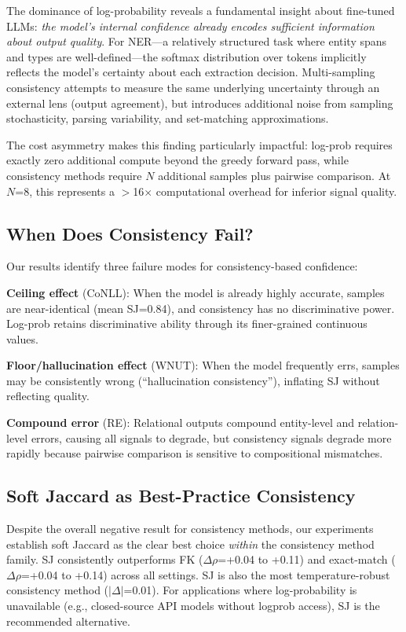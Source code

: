 \documentclass[11pt,a4paper]{article}
\begin{document}
The dominance of log-probability reveals a fundamental insight about fine-tuned LLMs: \emph{the model's internal confidence already encodes sufficient information about output quality}. For NER---a relatively structured task where entity spans and types are well-defined---the softmax distribution over tokens implicitly reflects the model's certainty about each extraction decision. Multi-sampling consistency attempts to measure the same underlying uncertainty through an external lens (output agreement), but introduces additional noise from sampling stochasticity, parsing variability, and set-matching approximations.

The cost asymmetry makes this finding particularly impactful: log-prob requires exactly zero additional compute beyond the greedy forward pass, while consistency methods require $N$ additional samples plus pairwise comparison. At $N$=8, this represents a $>$16$\times$ computational overhead for inferior signal quality.

\subsection{When Does Consistency Fail?}

Our results identify three failure modes for consistency-based confidence:

\textbf{Ceiling effect} (CoNLL): When the model is already highly accurate, samples are near-identical (mean SJ=0.84), and consistency has no discriminative power. Log-prob retains discriminative ability through its finer-grained continuous values.

\textbf{Floor/hallucination effect} (WNUT): When the model frequently errs, samples may be consistently wrong (``hallucination consistency''), inflating SJ without reflecting quality.

\textbf{Compound error} (RE): Relational outputs compound entity-level and relation-level errors, causing all signals to degrade, but consistency signals degrade more rapidly because pairwise comparison is sensitive to compositional mismatches.

\subsection{Soft Jaccard as Best-Practice Consistency}

Despite the overall negative result for consistency methods, our experiments establish soft Jaccard as the clear best choice \emph{within} the consistency method family. SJ consistently outperforms FK ($\Delta\rho$=+0.04 to +0.11) and exact-match ($\Delta\rho$=+0.04 to +0.14) across all settings. SJ is also the most temperature-robust consistency method ($|\Delta|$=0.01). For applications where log-probability is unavailable (e.g., closed-source API models without logprob access), SJ is the recommended alternative.
\end{document}
